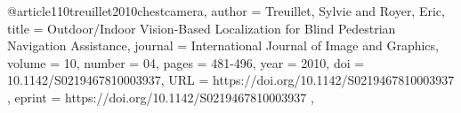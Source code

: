 @article{110treuillet2010chestcamera,
author = {Treuillet, Sylvie and Royer, Eric},
title = {Outdoor/Indoor Vision-Based Localization for Blind Pedestrian Navigation Assistance},
journal = {International Journal of Image and Graphics},
volume = {10},
number = {04},
pages = {481-496},
year = {2010},
doi = {10.1142/S0219467810003937},
URL = { https://doi.org/10.1142/S0219467810003937 },
eprint = { https://doi.org/10.1142/S0219467810003937 },
}